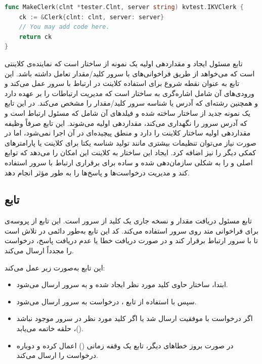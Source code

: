 \begin{latin}
\begin{lstlisting}[language=Go]
func MakeClerk(clnt *tester.Clnt, server string) kvtest.IKVClerk {
    ck := &Clerk{clnt: clnt, server: server}
    // You may add code here.
    return ck
}
\end{lstlisting}
\end{latin}

تابع  مسئول ایجاد و مقداردهی اولیه یک نمونه از ساختار  است که نماینده‌ی کلاینتی است که می‌خواهد از طریق فراخوانی‌های  با سرور کلید/مقدار تعامل داشته باشد. این تابع به عنوان نقطه شروع برای استفاده کلاینت در ارتباط با سرور عمل می‌کند و ورودی‌های آن شامل اشاره‌گری به ساختار  است که مدیریت ارتباطات  را بر عهده دارد و همچنین رشته‌ای که آدرس یا شناسه سرور کلید/مقدار را مشخص می‌کند. در این تابع یک نمونه جدید از ساختار  ساخته شده و فیلدهای آن شامل  که مسئول ارتباط  است و  که آدرس سرور را نگهداری می‌کند، مقداردهی اولیه می‌شوند. این تابع صرفاً وظیفه مقداردهی اولیه ساختار کلاینت را دارد و منطق پیچیده‌ای در آن اجرا نمی‌شود، اما در صورت نیاز می‌توان تنظیمات بیشتری مانند تولید شناسه یکتا برای کلاینت یا پارامترهای کمکی دیگر را نیز اضافه کرد. ایجاد این ساختار به کلاینت این امکان را می‌دهد که توابع اصلی  و  را به شکلی سازمان‌دهی شده و ساده برای برقراری ارتباط با سرور استفاده کند و مدیریت درخواست‌ها و پاسخ‌ها را به طور مؤثر انجام دهد.


\subsection*{تابع }

تابع  مسئول دریافت مقدار و نسخه جاری یک کلید از سرور است. این تابع از پروسه‌ی  برای فراخوانی متد  روی سرور استفاده می‌کند. کد این تابع به‌طور دائمی در تلاش است تا با سرور ارتباط برقرار کند و در صورت دریافت خطا یا عدم دریافت پاسخ، درخواست را مجدداً ارسال می‌کند.

این تابع به‌صورت زیر عمل می‌کند:
\begin{itemize}
  \item ابتدا، ساختار  حاوی کلید مورد نظر ایجاد شده و به سرور ارسال می‌شود.
  \item سپس با استفاده از تابع ، درخواست  به سرور ارسال می‌شود.
  \item اگر درخواست با موفقیت ارسال شد یا اگر کلید مورد نظر در سرور موجود نباشد ()، حلقه خاتمه می‌یابد.
  \item در صورت بروز خطاهای دیگر، تابع یک وقفه زمانی () اعمال کرده و دوباره درخواست را ارسال می‌کند.
\end{itemize}

